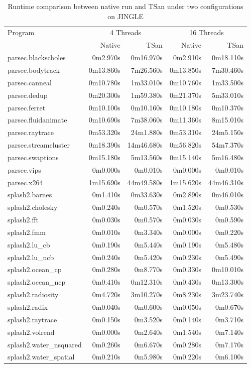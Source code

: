 \begin{table}[htbp]
\centering
\begin{tabular}{|l|r|r|r|r|}\hline \hline
 \multirow{2}{*}{Program} &  \multicolumn{2}{c|}{4 Threads } & \multicolumn{2}{c|}{16 Threads } \\ \cline{2-5}
	& Native & TSan & Native & TSan \\ \hline \hline
	
	
parsec.blackscholes	&0m2.970s	&0m16.970s	&0m2.910s	&0m18.110s	\\\hline
parsec.bodytrack	&0m13.860s	&7m26.560s	&0m13.850s	&7m30.460s	\\\hline
parsec.canneal	&0m10.780s	&1m33.010s	&0m10.760s	&1m33.500s	\\\hline
parsec.dedup	&0m20.300s	&1m59.380s	&0m21.370s	&5m33.010s	\\\hline
parsec.ferret	&0m10.100s	&0m10.160s	&0m10.180s	&0m10.370s	\\\hline
parsec.fluidanimate	&0m10.690s	&7m38.060s	&0m11.360s	&8m15.010s	\\\hline
parsec.raytrace	&0m53.320s	&24m1.880s	&0m53.310s	&24m5.150s	\\\hline
parsec.streamcluster	&0m18.390s	&14m46.680s	&0m56.820s	&54m7.370s	\\\hline
parsec.swaptions	&0m15.180s	&5m13.560s	&0m15.140s	&5m16.480s	\\\hline
parsec.vips	&0m0.000s	&0m0.010s	&0m0.000s	&0m0.010s	\\\hline
parsec.x264	&1m15.690s	&44m49.580s	&1m15.620s	&44m46.310s	\\\hline
splash2.barnes	&0m1.410s	&0m33.630s	&0m2.890s	&0m46.010s	\\\hline
splash2.cholesky	&0m0.240s	&0m0.570s	&0m1.520s	&0m0.530s	\\\hline
splash2.fft	&0m0.030s	&0m0.570s	&0m0.030s	&0m0.590s	\\\hline
splash2.fmm	&0m0.010s	&0m3.340s	&0m0.000s	&0m0.220s	\\\hline
splash2.lu\_cb	&0m0.190s	&0m5.440s	&0m0.190s	&0m5.480s	\\\hline
splash2.lu\_ncb	&0m0.240s	&0m5.420s	&0m0.230s	&0m5.490s	\\\hline
splash2.ocean\_cp	&0m0.280s	&0m8.770s	&0m0.330s	&0m10.010s	\\\hline
splash2.ocean\_ncp	&0m0.410s	&0m12.310s	&0m0.430s	&0m13.300s	\\\hline
splash2.radiosity	&0m4.720s	&3m10.270s	&0m8.230s	&3m23.740s	\\\hline
splash2.radix	&0m0.040s	&0m0.600s	&0m0.050s	&0m0.670s	\\\hline
splash2.raytrace	&0m0.150s	&0m3.520s	&0m0.140s	&0m3.710s	\\\hline
splash2.volrend	&0m0.000s	&0m2.640s	&0m1.540s	&0m7.140s	\\\hline
splash2.water\_nsquared	&0m0.260s	&0m6.670s	&0m0.280s	&0m7.170s	\\\hline
splash2.water\_spatial	&0m0.210s	&0m5.980s	&0m0.220s	&0m6.100s	\\\hline
\end{tabular}
\caption{Runtime comparison between native run and TSan under two configurations on JINGLE}
\end{table}


